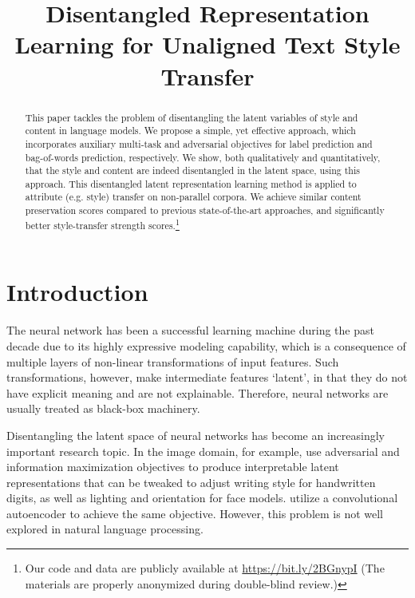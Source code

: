 \documentclass[letterpaper]{article} %
\title{Disentangled Representation Learning for Unaligned Text Style Transfer}
\date{}
\newcommand{\citeay}[1]{\citeauthor{#1} \shortcite{#1}}
\begin{document}
\maketitle
\graphicspath{{images/}}

\begin{abstract}
	This paper tackles the problem of disentangling the latent variables of style and content in language models.
	We propose a simple, yet effective approach, which incorporates auxiliary multi-task and adversarial objectives for label prediction and bag-of-words prediction, respectively.
	We show, both qualitatively and quantitatively, that the style and content are indeed disentangled in the latent space, using this approach.
	This disentangled latent representation learning method is applied to attribute (e.g. style) transfer on non-parallel corpora.
	We achieve similar content preservation scores compared to previous state-of-the-art approaches, and significantly better style-transfer strength scores.\footnote{Our code and data are publicly available at \url{https://bit.ly/2BGnypI} (The materials are properly anonymized during double-blind review.)}
\end{abstract}

% 


\section{Introduction}

The neural network has been a successful learning machine during the past decade due to its highly expressive modeling capability, which is a consequence of multiple layers of non-linear transformations of input features.
Such transformations, however, make intermediate features `latent', in that they do not have explicit meaning and are not explainable.
Therefore, neural networks are usually treated as black-box machinery.

Disentangling the latent space of neural networks has become an increasingly important research topic.
In the image domain, for example, \citeay{chen2016infogan} use adversarial and information maximization objectives to produce interpretable latent representations that can be tweaked to adjust writing style for handwritten digits, as well as lighting and orientation for face models.
\citeay{mathieu2016disentangling} utilize a convolutional autoencoder to achieve the same objective.
However, this problem is not well explored in natural language processing.
\end{document}

